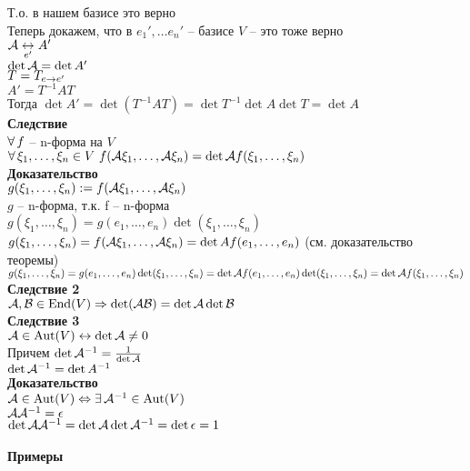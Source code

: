 \documentclass[12pt]{article}
\begin{document}
Т.о. в нашем базисе это верно\\
Теперь докажем, что в $e_1', \ldots e_n'$ -- базисе $V$ -- это тоже верно\\
$\mathcal{A} \underset{e'}{\leftrightarrow} A'$\\
$\det \mathcal{A} = \det A'$\\
$T=T_{e\rightarrow e'}$\\
$A' = T^{-1}AT$\\
Тогда $\det A' = \det(T^{-1}AT) = \det T^{-1}\det A\det T = \det A$\\
\textbf{Следствие}\\
$\forall\, f$ -- n-форма на $V$\\
$\forall\, \xi_1, \ldots, \xi_n \in V\ f(\mathcal{A} \xi_1, \ldots, \mathcal{A} \xi_n) = \det \mathcal{A} f(\xi_1, \ldots, \xi_n)$\\
\textbf{Доказательство}\\
$g(\xi_1, \ldots, \xi_n):=f(\mathcal{A} \xi_1, \ldots, \mathcal{A} \xi_n)$\\
$g$ -- n-форма, т.к. f -- n-форма\\
$g(\xi_1, \ldots, \xi_n) = g(e_1, \ldots, e_n)\det(\xi_1, \ldots, \xi_n)$\\
$g(\xi_1, \ldots, \xi_n)=f(\mathcal{A} \xi_1, \ldots, \mathcal{A} \xi_n) = \det A f(e_1, \ldots, e_n)$ (см. доказательство теоремы)\\
$g(\xi_1, \ldots, \xi_n) = g(e_1, \ldots, e_n)\det(\xi_1, \ldots, \xi_n) = \det \mathcal{A} f(e_1, \ldots, e_n)\det(\xi_1,\ldots,\xi_n) = \det \mathcal{A} f(\xi_1, \ldots, \xi_n)$\\
\textbf{Следствие 2}\\
$\mathcal{A}, \mathcal{B} \in \operatorname{End}(V) \Rightarrow \det(\mathcal{A}\mathcal{B}) = \det\mathcal{A}\det\mathcal{B}$\\
\textbf{Следствие 3}\\
$\mathcal{A} \in \operatorname{Aut}(V) \leftrightarrow \det \mathcal{A} \neq 0$\\
Причем $\det \mathcal{A}^{-1} = \frac{1}{\det \mathcal{A}}$\\
$\det \mathcal{A}^{-1} = \det A^{-1}$\\
\textbf{Доказательство}\\
$\mathcal{A} \in \operatorname{Aut}(V) \Leftrightarrow \exists\, \mathcal{A}^{-1} \in \operatorname{Aut}(V)$\\
$\mathcal{A}\mathcal{A}^{-1} = \epsilon$\\
$\det \mathcal{A}\mathcal{A}^{-1} = \det\mathcal{A}\det \mathcal{A}^{-1} = \det \epsilon = 1$\\\\
\textbf{Примеры}
\end{document}
